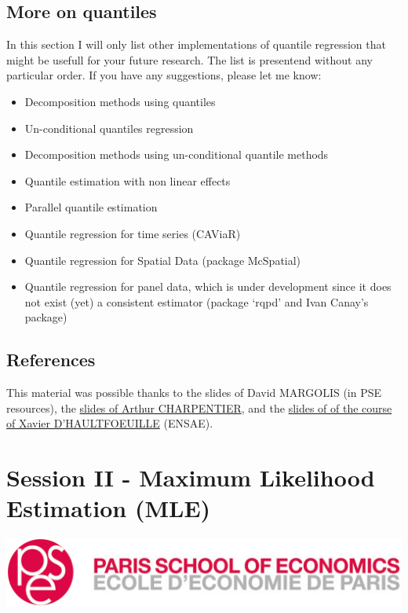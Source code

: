 \documentclass[]{book}
\providecommand{\tightlist}{%
  \setlength{\itemsep}{0pt}\setlength{\parskip}{0pt}}
\begin{document}
\section{More on quantiles}\label{more-on-quantiles}

In this section I will only list other implementations of quantile
regression that might be usefull for your future research. The list is
presentend without any particular order. If you have any suggestions,
please let me know:

\begin{itemize}
\tightlist
\item
  Decomposition methods using quantiles
  \citep{machado2005counterfactual}
\item
  Un-conditional quantiles regression \citep{firpo2009unconditional}
\item
  Decomposition methods using un-conditional quantile methods
  \citep{firpo2018decomposing}
\item
  Quantile estimation with non linear effects
\item
  Parallel quantile estimation
\item
  Quantile regression for time series (CAViaR)
\item
  Quantile regression for Spatial Data (package McSpatial)
\item
  Quantile regression for panel data, which is under development since
  it does not exist (yet) a consistent estimator (package `rqpd' and
  Ivan Canay's package)
\end{itemize}

\section{References}\label{references}

This material was possible thanks to the slides of David MARGOLIS (in
PSE resources), the
\href{https://freakonometrics.hypotheses.org/files/2017/05/erasmus-1.pdf}{slides
of Arthur CHARPENTIER}, and the
\href{http://www.crest.fr/ckfinder/userfiles/files/Pageperso/xdhaultfoeuille/course_qreg.pdf}{slides
of of the course of Xavier D'HAULTFOEUILLE} (ENSAE).

\chapter{Session II - Maximum Likelihood Estimation
(MLE)}\label{session-ii---maximum-likelihood-estimation-mle}

\begin{center}\includegraphics[width=0.9\linewidth]{./images/1200px-Logo_pse_petit} \end{center}
\end{document}
